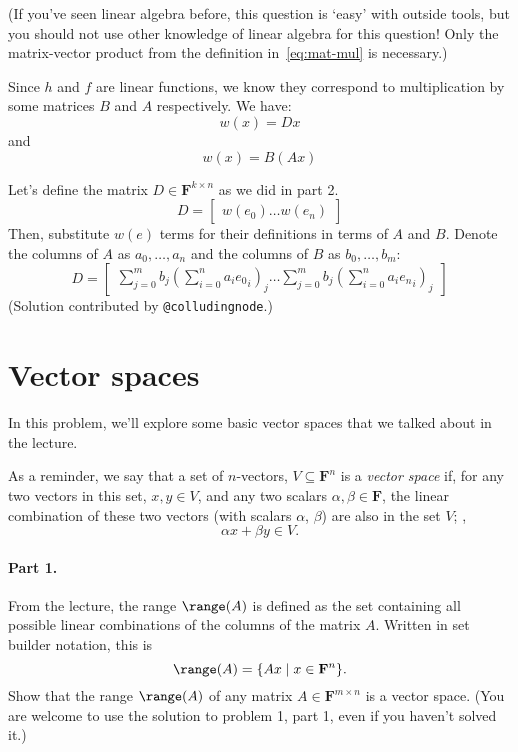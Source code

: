 \documentclass[12pt,hidelinks]{article}
\newcommand{\field}{\mathbf{F}}
\begin{document}
(If you've seen linear algebra before, this question is `easy' with outside
tools, but you should not use other knowledge of linear algebra for this
question! Only the matrix-vector product from the definition
in~\eqref{eq:mat-mul} is necessary.)

\begin{solution}
Since $h$ and $f$ are linear functions, we know they correspond to multiplication by some matrices $B$ and $A$ respectively. We have:
\[
w(x) = Dx
\]
and
\[
w(x) = B(Ax)
\]

Let's define the matrix $D \in \field^{k \times n}$ as we did in part 2.
\[
D = \begin{bmatrix}w(e_{0}) \dots w(e_{n})\end{bmatrix}
\]
Then, substitute $w(e)$ terms for their definitions in terms of $A$ and $B$. Denote the columns of $A$ as $a_{0}, \dots , a_{n}$ and the columns of $B$ as $b_{0}, \dots , b_{m}$:
\[
D = \begin{bmatrix}\sum_{j=0}^{m}b_{j}(\sum_{i=0}^{n}a_{i}{e_{0}}_{i})_{j} \dots \sum_{j=0}^{m}b_{j}(\sum_{i=0}^{n}a_{i}{e_{n}}_{i})_{j}\end{bmatrix}
\]
(Solution contributed by \verb|@colludingnode|.)
\end{solution}

\section{Vector spaces}
In this problem, we'll explore some basic vector spaces that we talked about in the
lecture.

As a reminder, we say that a set of $n$-vectors, $V \subseteq \field^n$ is a
\emph{vector space} if, for any two vectors in this set, $x, y \in V$, and any
two scalars $\alpha, \beta \in \field$, the linear combination of these two
vectors (with scalars $\alpha$, $\beta$) are also in the set $V$; \ie,
\[
    \alpha x + \beta y \in V.
\]

\paragraph{Part 1.} From the lecture, the range $\range(A)$
is defined as the set containing all possible linear combinations of the
columns of the matrix $A$. Written in set builder notation, this is
\[
    \range(A) = \{Ax \mid x \in \field^n\}.
\]
Show that the range $\range(A)$ of any matrix $A \in \field^{m\times n}$ is a
vector space. (You are welcome to use the solution to problem 1, part 1, even
if you haven't solved it.)
\end{document}
